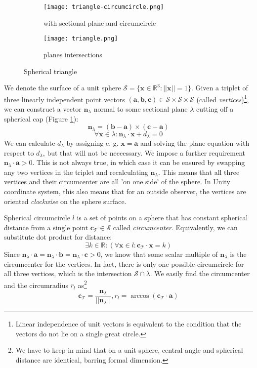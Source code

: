 \begin{figure}[ht]
\centering
\begin{subfigure}{8cm}
\texttt{[image: triangle-circumcircle.png]}
\caption{with sectional plane and circumcircle}
\label{fig:triangle-circumcircle}
\end{subfigure}
\begin{subfigure}{8cm}
\texttt{[image: triangle.png]}
\caption{planes intersections}
\label{fig:spherical-triangle-visual}
\end{subfigure}
\caption{Spherical triangle}
\label{fig:spherical-triangle}
\end{figure}

 We denote the surface of a unit sphere $\mathcal{S} =  \{\mathbf{x} \in \mathbb{R}^3: ||\mathbf{x}||=1\}$. Given a triplet of three linearly independent point vectors $(\mathbf{a},\mathbf{b},\mathbf{c})\in \mathcal{S}\times\mathcal{S}\times\mathcal{S}$ (called \textit{vertices})\footnote{Linear independence of unit vectors is equivalent to the condition that the vectors do not lie on a single great circle.}, we can construct a vector $\mathbf{n}_\lambda$ normal to some sectional plane $\lambda$ cutting off a spherical cap (Figure \ref{fig:triangle-circumcircle}):
 $$\mathbf{n}_\lambda=(\mathbf{b} - \mathbf{a})\times(\mathbf{c} - \mathbf{a})$$
$$\forall\mathbf{x}\in\lambda: \mathbf{n}_\lambda\cdot\mathbf{x}+d_\lambda=0$$
We can calculate $d_\lambda$ by assigning e. g. $\mathbf{x}=\mathbf{a}$ and solving the plane equation with respect to $d_\lambda$, but that will not be neccessary. We impose a further requirement $\mathbf{n}_\lambda\cdot\mathbf{a}>0$. This is not always true, in which case it can be ensured by swapping any two vertices in the triplet and recalculating $\mathbf{n}_\lambda$. This means that all three vertices and their circumcenter are all 'on one side' of the sphere. In Unity coordinate system, this also means that for an outside observer, the vertices are oriented \textit{clockwise} on the sphere surface.

Spherical circumcircle $l$ is a set of points on a sphere that has constant spherical distance from a single point $\mathbf{c}_\mathcal{T}\in\mathcal{S}$ called \textit{circumcenter}. Equivalently, we can substitute dot product for distance:
$$\exists k\in\mathbb{R}:(\forall\mathbf{x}\in l:\mathbf{c}_\mathcal{T}\cdot\mathbf{x}=k)$$
Since $\mathbf{n}_\lambda\cdot\mathbf{a}=\mathbf{n}_\lambda\cdot\mathbf{b}=\mathbf{n}_\lambda\cdot\mathbf{c}>0$, we know that some scalar multiple of $\mathbf{n}_\lambda$ is the circumcenter for the vertices. In fact, there is only one possible circumcircle for all three vertices, which is the intersection $\mathcal{S}\cap\lambda$. We easily find the circumcenter and the circumradius $r_l$ as\footnote{We have to keep in mind that on a unit sphere, central angle and spherical distance are identical, barring formal dimension.}
$$\mathbf{c}_\mathcal{T}=\frac{\mathbf{n}_\lambda}{||\mathbf{n}_\lambda||}, r_l=\arccos(\mathbf{c}_\mathcal{T}\cdot\mathbf{a})$$

